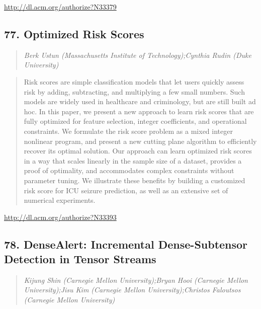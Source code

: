 \documentclass{article}
\begin{document}
\href{http://dl.acm.org/authorize?N33379}{http://dl.acm.org/authorize?N33379}

\subsection{77. Optimized Risk Scores}

\begin{quote}
\footnotesize{\textit{Berk Ustun (Massachusetts Institute of Technology);Cynthia Rudin (Duke University)}}

\end{quote}

\begin{quote}
Risk scores are simple classification models that let users quickly assess risk by adding, subtracting, and multiplying a few small numbers. Such models are widely used in healthcare and criminology, but are still built ad hoc. In this paper, we present a new approach to learn risk scores that are fully optimized for feature selection, integer coefficients, and operational constraints. We formulate the risk score problem as a mixed integer nonlinear program, and present a new cutting plane algorithm to efficiently recover its optimal solution. Our approach can learn optimized risk scores in a way that scales linearly in the sample size of a dataset, provides a proof of optimality, and accommodates complex constraints without parameter tuning. We illustrate these benefits by building a customized risk score for ICU seizure prediction, as well as an extensive set of numerical experiments.
\end{quote}

\href{http://dl.acm.org/authorize?N33393}{http://dl.acm.org/authorize?N33393}

\subsection{78. DenseAlert: Incremental Dense-Subtensor Detection in Tensor Streams}

\begin{quote}
\footnotesize{\textit{Kijung Shin (Carnegie Mellon University);Bryan Hooi (Carnegie Mellon University);Jisu Kim (Carnegie Mellon University);Christos Faloutsos (Carnegie Mellon University)}}

\end{quote}
\end{document}
